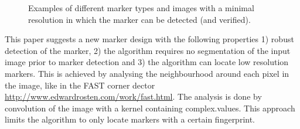 \documentclass{article}
\begin{document}
\begin{figure}
\caption{Examples of different marker types and images with
a minimal resolution in which the marker can be detected (and verified).}
\label{figExampleMarkerTypes}
\end{figure}
This paper suggests a new marker design with the following properties
1) robust detection of the marker,
2) the algorithm requires no segmentation of the input image prior to marker detection and
3) the algorithm can locate low resolution markers.
This is achieved by analysing the neighbourhood around each pixel in the image, like in the FAST corner dector \url{http://www.edwardrosten.com/work/fast.html}.
The analysis is done by convolution of the image with a kernel containing complex.values.
This approach limits the algorithm to only locate markers with a certain fingerprint.

\end{document}
